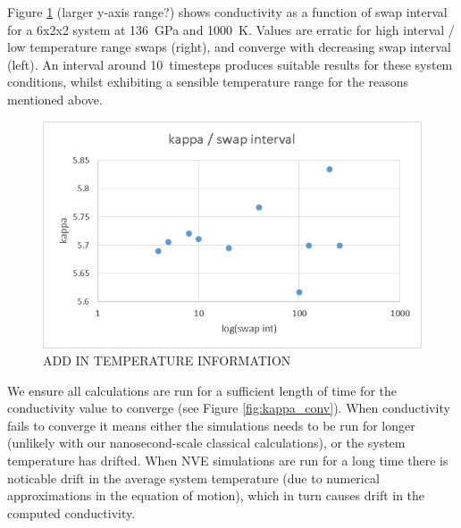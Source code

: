 \documentclass[%
preprint,                                  %
nofootinbib,
 amsmath,amssymb,
 aps,
]{revtex4-1}
\begin{document}
Figure \ref{fig:swap_int} (larger y-axis range?) shows conductivity as a function of swap interval for a 6x2x2 system at 136~GPa and 1000~K. Values are erratic for high interval / low temperature range swaps (right), and converge with decreasing swap interval (left). An interval around 10~timesteps produces suitable results for these system conditions, whilst exhibiting a sensible temperature range for the reasons mentioned above. 


\begin{figure}[h!]
  \includegraphics[width=\linewidth]{images/swap_int.png}
  \caption{ADD IN TEMPERATURE INFORMATION}
  \label{fig:swap_int}
\end{figure}

We ensure all calculations are run for a sufficient length of time for the conductivity value to converge (see Figure \ref{fig:kappa_conv}). When conductivity fails to converge it means either the simulations needs to be run for longer (unlikely with our nanosecond-scale classical calculations), or the system temperature has drifted. When NVE simulations are run for a long time there is noticable drift in the average system temperature (due to  numerical approximations in the equation of motion), which in turn causes drift in the computed conductivity.
\end{document}
